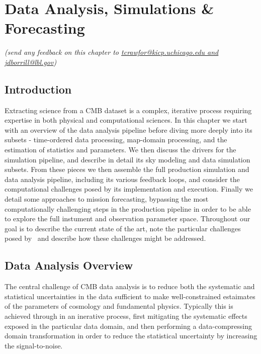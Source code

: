  
\chapter{Data Analysis, Simulations \& Forecasting}


\begin{center}
{\it \small (send any feedback on this chapter to \href{mailto:tcrawfor@kicp.uchicago.edu,jdborrill@lbl.gov}{tcrawfor@kicp.uchicago.edu and jdborrill@lbl.gov})}
\end{center}

\section{Introduction}

Extracting science from a CMB dataset is a complex, iterative process requiring expertise in both physical and computational sciences. In this chapter we start with an overview of the data analysis pipeline before diving more deeply into its subsets - time-ordered data processing, map-domain processing, and the estimation of statistics and parameters. We then discuss the drivers for the simulation pipeline, and describe in detail its sky modeling and data simulation subsets. From these pieces we then assemble the full production simulation and data analysis pipeline, including its various feedback loops, and consider the computational challenges posed by its implementation and execution. Finally we detail some approaches to mission forecasting, bypassing the most computationally challenging steps in the production pipeline in order to be able to explore the full instument and observation parameter space. Throughout our goal is to describe the current state of the art, note the particular challenges posed by \cmbexp\, and describe how these challenges might be addressed.

\section{Data Analysis Overview}

The central challenge of CMB data analysis is to reduce both the systematic and statistical uncertainties in the data sufficient to make well-constrained estaimates of the parameters of cosmology and fundamental physics. Typically this is achieved through in an inerative process, first mitigating the systematic effects exposed in the particular data domain, and then performing a data-compressing domain transformation in order to reduce the statistical uncertainty by increasing the signal-to-noise.

